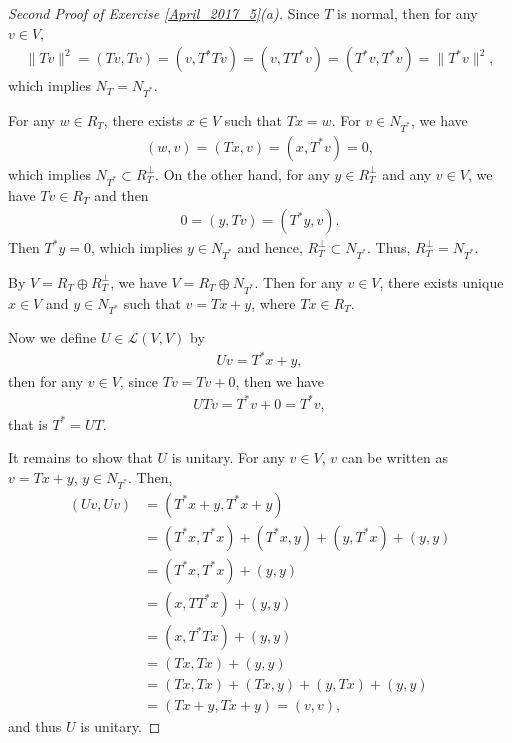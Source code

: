 \documentclass[11pt]{article}
\theoremstyle{definition}
\numberwithin{equation}{subsection}
\begin{document}
\begin{proof}[Second Proof of Exercise \ref{April_2017_5}(a)]{\rm *}
Since $T$ is normal, then for any $v \in V$,
\begin{align*}
    \|Tv\|^2 = (Tv, Tv) = \left(v, T^*Tv\right) = \left(v, TT^*v\right) = \left(T^*v, T^*v\right) = \|T^*v\|^2,
\end{align*}
which implies $N_T = N_{T^*}$. 

For any $w \in R_T$, there exists $x \in V$ such that $Tx = w$. For $v \in N_{T^*}$, we have
\begin{align*}
    (w, v) = (Tx, v) = (x, T^*v) = 0,
\end{align*}
which implies $N_{T^*} \subset R_T^\bot$. On the other hand, for any $y \in R_T^\bot$ and any $v \in V$, we have $Tv \in R_T$ and then
\begin{align*}
    0 = (y, Tv) = (T^*y, v).
\end{align*}
Then $T^*y = 0$, which implies $y \in N_{T^*}$ and hence, $R_T^\bot \subset N_{T^*}$. Thus, $R_T^\bot = N_{T^*}$.

By $V = R_T \oplus R_T^\bot$, we have $V = R_T \oplus N_{T^*}$. Then for any $v \in V$, there exists unique $x \in V$ and $y \in N_{T^*}$ such that $v = Tx + y$, where $Tx \in R_T$.

Now we define $U \in \mathscr{L}(V, V)$ by
\begin{align*}
    Uv = T^* x + y,
\end{align*}
then for any $v \in V$, since $Tv = Tv + 0$, then we have
\begin{align*}
    UTv = T^*v + 0 = T^*v,
\end{align*}
that is $T^* = UT$.

It remains to show that $U$ is unitary. For any $v \in V$, $v$ can be written as $v = Tx + y$, $y \in N_{T^*}$. Then,
\begin{align*}
    (Uv, Uv) & = (T^* x + y, T^* x + y) \\
    & = (T^*x, T^*x) + (T^*x, y) + (y, T^*x) + (y, y) \\
    & = (T^*x, T^*x) + (y, y) \\
    & = (x, TT^*x) + (y,y) \\
    & = (x, T^*Tx) + (y,y) \\
    & = (Tx, Tx) + (y,y) \\
    & = (Tx, Tx) + (Tx, y) + (y, Tx) + (y,y) \\
    & = (Tx + y, Tx + y) = (v, v),
\end{align*}
and thus $U$ is unitary.
\end{proof}
\end{document}
